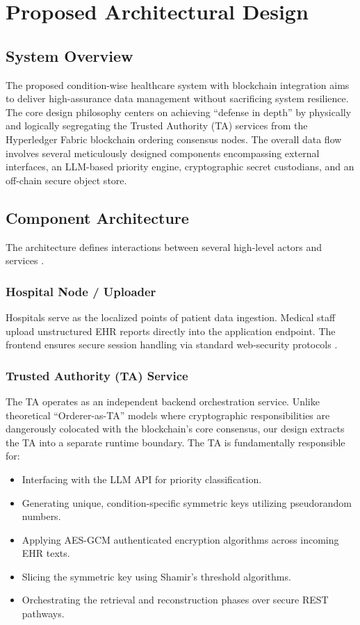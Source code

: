 \chapter{Proposed Architectural Design}

\section{System Overview}
The proposed condition-wise healthcare system with blockchain integration aims to deliver high-assurance data management without sacrificing system resilience. The core design philosophy centers on achieving ``defense in depth'' by physically and logically segregating the Trusted Authority (TA) services from the Hyperledger Fabric blockchain ordering consensus nodes. The overall data flow involves several meticulously designed components encompassing external interfaces, an LLM-based priority engine, cryptographic secret custodians, and an off-chain secure object store.

\section{Component Architecture}
The architecture defines interactions between several high-level actors and services \cite{kumar2022fog}.

\subsection{Hospital Node / Uploader}
Hospitals serve as the localized points of patient data ingestion. Medical staff upload unstructured EHR reports directly into the application endpoint. The frontend ensures secure session handling via standard web-security protocols \cite{torongo2023decentralized}.

\subsection{Trusted Authority (TA) Service}
The TA operates as an independent backend orchestration service. Unlike theoretical ``Orderer-as-TA'' models where cryptographic responsibilities are dangerously colocated with the blockchain's core consensus, our design extracts the TA into a separate runtime boundary. The TA is fundamentally responsible for:
\begin{itemize}
    \item Interfacing with the LLM API for priority classification.
    \item Generating unique, condition-specific symmetric keys utilizing pseudorandom numbers.
    \item Applying AES-GCM authenticated encryption algorithms across incoming EHR texts.
    \item Slicing the symmetric key using Shamir's threshold algorithms.
    \item Orchestrating the retrieval and reconstruction phases over secure REST pathways.
\end{itemize}

